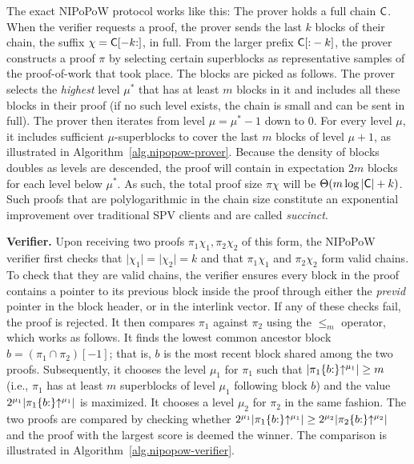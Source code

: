 
The exact NIPoPoW protocol works like this: The prover holds a full chain
$\mathsf{C}$. When the verifier requests a proof, the prover sends the last $k$
blocks of their chain, the suffix $\chi = \mathsf{C}[-k{:}]$, in full. From the
larger prefix $\mathsf{C}[{:}-k]$, the prover constructs a proof $\pi$ by selecting
certain superblocks as representative samples of the proof-of-work that took
place. The blocks are picked as follows. The prover selects the \emph{highest}
level $\mu^*$ that has at least $m$ blocks in it and includes all these blocks
in their proof (if no such level exists, the chain is small and can be sent in
full). The prover then iterates from level $\mu = \mu^* - 1$ down to $0$. For
every level $\mu$, it includes sufficient $\mu$-superblocks to cover the last
$m$ blocks of level $\mu + 1$, as illustrated in
Algorithm~\ref{alg.nipopow-prover}. Because the density of blocks doubles as
levels are descended, the proof will contain in expectation $2m$ blocks for each
level below $\mu^*$. As such, the total proof size $\pi \chi$ will be
$\Theta(m\log|\mathsf{C}| + k)$. Such proofs that are polylogarithmic in the chain
size constitute an exponential improvement over traditional SPV clients and are
called \emph{succinct}.

\noindent \textbf{Verifier.} Upon receiving two proofs $\pi_1\chi_1,
\pi_2\chi_2$ of this form, the NIPoPoW verifier first checks that $\lvert
\chi_1 \rvert = \lvert \chi_2 \rvert = k$ and that $\pi_1 \chi_1$ and $\pi_2
\chi_2$ form valid chains. To check that they are valid chains, the verifier
ensures every block in the proof contains a pointer to its previous block
inside the proof through either the \emph{previd} pointer in the block header,
or in the interlink vector. If any of these checks fail, the proof is rejected.
It then compares $\pi_1$ against $\pi_2$ using the $\leq_m$ operator, which
works as follows. It finds the lowest common ancestor block $b = (\pi_1 \cap
\pi_2)[-1]$; that is, $b$ is the most recent block shared among the two proofs.
Subsequently, it chooses the level $\mu_1$ for $\pi_1$ such that $\lvert
\pi_1\{b{:}\}\negthickspace\uparrow^{\mu_1} \rvert \geq m$ (i.e., $\pi_1$ has at least $m$
superblocks of level $\mu_1$ following block $b$) and the value $2^{\mu_1}
\lvert \pi_1\{b{:}\}\negthickspace\uparrow^{\mu_1} \rvert$ is maximized.  It chooses a level
$\mu_2$ for $\pi_2$ in the same fashion. The two proofs are compared by
checking whether $2^{\mu_1} \lvert \pi_1\{b{:}\}\negthickspace\uparrow^{\mu_1} \rvert \geq
2^{\mu_2} \lvert \pi_2\{b{:}\}\negthickspace\uparrow^{\mu_2} \rvert$ and the proof with the
largest score is deemed the winner. The comparison is illustrated in
Algorithm~\ref{alg.nipopow-verifier}.

